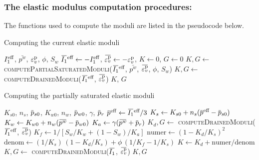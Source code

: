   \subsubsection{The elastic modulus computation procedures:}
  The functions used to compute the moduli are listed in the pseudocode below.
  \begin{breakablealgorithm}
  \caption{Computing the current elastic moduli}
  \begin{algorithmic}[1]
    \Require $I_1^{\text{eff}}$, $\bar{p^w}$, $\varepsilon_v^{\text{p}}$, $\phi$, $S_w$
      \State $\bar{I_1}^\Teff \leftarrow -I_1^\Teff$, $\bar{\Veps_v^\Tp} \leftarrow -\Veps_v^\Tp$,
      \State $K \leftarrow 0$, $G \leftarrow 0$
        \State $K, G \leftarrow$ \textsc{computePartialSaturatedModuli}($\bar{I_1}^\Teff$, $\bar{p^w}$,
           $\bar{\Veps_v^\Tp}$, $\phi$, $S_w$)
      \Else
        \State $K, G \leftarrow$ \textsc{computeDrainedModuli}($\bar{I_1}^\Teff$, $\bar{\Veps_v^\Tp}$)
      \EndIf
      \State \Return $K$, $G$
    \EndProcedure
  \end{algorithmic}
  \end{breakablealgorithm}

  \begin{breakablealgorithm}
  \caption{Computing the partially saturated elastic moduli}
  \begin{algorithmic}[1]
    \Require $K_{s0}$, $n_s$, $\pbar_{s0}$, $K_{w0}$, $n_w$, $\pbar_{w0}$, $\gamma$, $\pbar_r$
        \State $\pbar^\Teff \leftarrow \Ionebar^\Teff/3$
        \State $K_s \leftarrow K_{s0} + n_s (\pbar^\Teff - \pbar_{s0})$
        \State $K_w \leftarrow K_{w0} + n_w (\bar{p^w} - \pbar_{w0})$
        \State $K_a \leftarrow \gamma (\bar{p^w} + \pbar_r)$
        \State $K_d, G \leftarrow$ \textsc{computeDrainedModuli}($\Ionebar^\Teff$, $\bar{\Veps^\Tp_v}$)
        \State $K_f \leftarrow 1/\left[S_w/K_w + (1-S_w)/K_a\right]$
        \State $\text{numer} \leftarrow (1 - K_d/K_s)^2$
        \State $\text{denom} \leftarrow (1/K_s)\,(1 - K_d/K_s) + \phi\,(1/K_f - 1/K_s)$
        \State $K \leftarrow K_d + \text{numer}/\text{denom}$
      \Else
        \State $K, G \leftarrow$ \textsc{computeDrainedModuli}($\Ionebar$, $\bar{\Veps^\Tp_v}$)
      \EndIf
      \State \Return $K, G$
    \EndProcedure
  \end{algorithmic}
  \end{breakablealgorithm}

